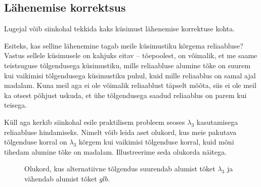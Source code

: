 \documentclass[a4paper,12pt,oneside]{article}
\newenvironment{naide}{
    \begin{lrbox}{\boxTwo}
        \begin{minipage}{\textwidth}
    }
    {\end{minipage}\end{lrbox}
    	\colorbox{background_example}{\usebox{\boxTwo}}
    }
\numberwithin{equation}{section}
\theoremstyle{definition}
\begin{document}
\subsection{Lähenemise korrektsus}

Lugejal võib siinkohal tekkida kaks küsimust lähenemise korrektuse kohta.

Esiteks, kas selline lähenemine tagab meile küsimustiku kõrgema reliaabluse? Vastus sellele küsimusele on kahjuks eitav -- tõepoolest, on võimalik, et me saame teistsuguse tõlgendusega küsimustiku, mille reliaabluse alumine tõke on suurem kui vaikimisi tõlgendusega küsimustiku puhul, kuid mille reliaablus on samal ajal madalam. Kuna meil aga ei ole võimalik reliaablust täpselt mõõta, siis ei ole meil ka otsest põhjust uskuda, et ühe tõlgendusega saadud reliaablus on parem kui teisega.

Küll aga kerkib siinkohal esile praktilisem probleem seoses $\lambda_3$ kasutamisega reliaabluse hindamiseks. Nimelt võib leida aset olukord, kus meie pakutava tõlgenduse korral on $\lambda_3$ kõrgem kui vaikimisi tõlgenduse korral, kuid mõni tihedam alumine tõke on madalam. Illustreerime seda olukorda näitega.
 
\begin{figure}[H]
\begin{naide}
\end{naide}
\caption{Olukord, kus alternatiivne tõlgendus suurendab alumist tõket $\lambda_3$ ja vähendab alumist tõket $glb$.}
\end{figure}
\end{document}

